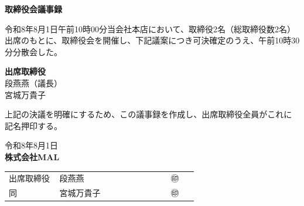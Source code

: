 \documentclass[10pt,a4paper]{article}
\begin{document}
\begin{center}
{\large\bfseries 取締役会議事録}
\end{center}

\vspace{3mm}
\indent\footnotesize
令和8年8月1日午前10時00分当会社本店において、取締役2名（総取締役数2名）出席のもとに、取締役会を開催し、下記議案につき可決確定のうえ、午前10時30分分散会した。

\vspace{3mm}
\noindent\footnotesize\textbf{出席取締役}\\[0.5mm]
段燕燕（議長）\\
宮城万貴子


\vspace{3mm}

\vspace{4mm}
\indent\footnotesize
上記の決議を明確にするため、この議事録を作成し、出席取締役全員がこれに記名押印する。

\vfill
\noindent\hfill
\begin{minipage}{0.58\textwidth}
\begin{center}\footnotesize
令和8年8月1日\\[5mm]
{\bfseries 株式会社MAL}\\[6mm]
\begin{tabular}{@{}p{0.26\linewidth}p{0.58\linewidth}@{}>{\raggedleft\arraybackslash}p{0.14\linewidth}@{}}
出席取締役 & 段燕燕 & ㊞ \\
同 & 宮城万貴子 & ㊞ \\
\end{tabular}
\end{center}
\end{minipage}


\newpage

\MojReceiptBox
{}


\end{document}
